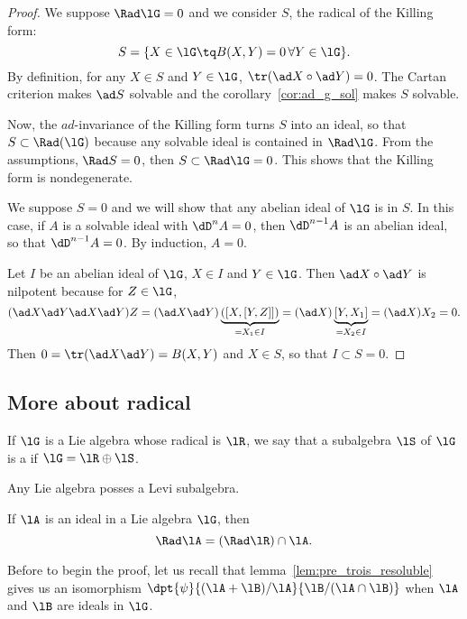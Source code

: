 \begin{proof}
	We suppose $\Rad\lG=0$ and we consider $S$, the radical of the Killing form:
	\[
		S=\{X\in\lG\tq B(X,Y)=0\,\forall Y\in\lG\}.
	\]
	By definition, for any $X\in S$ and $Y\in\lG$, $\tr(\ad X\circ\ad Y)=0$. The Cartan criterion makes $\ad S$ solvable and the corollary~\ref{cor:ad_g_sol} makes $S$ solvable.

	Now, the $ad$-invariance of the Killing form turns $S$ into an ideal, so that $S\subset\Rad(\lG)$ because any solvable ideal is contained in $\Rad\lG$. From the assumptions, $\Rad S=0$, then $S\subset\Rad\lG=0$. This shows that the Killing form is nondegenerate.

	We suppose $S=0$ and we will show that any abelian ideal of $\lG$ is in $S$. In this case, if $A$ is a solvable ideal with $\dD^nA=0$, then $\dD^{n-1}A$ is an abelian ideal, so that $\dD^{n-1}A=0$. By induction, $A=0$.

	Let $I$ be an abelian ideal of $\lG$, $X\in I$ and $Y\in\lG$. Then $\ad X\circ\ad Y$ is nilpotent because for $Z\in\lG$,
	\begin{equation}
		(\ad X\ad Y\ad X\ad Y)Z=(\ad X\ad Y)\underbrace{( [X,[Y,Z]] )}_{=X_1\in I}
		=(\ad X)\underbrace{[Y,X_1]}_{=X_2\in I}
		=(\ad X)X_2
		=0.
	\end{equation}
	Then $0=\tr(\ad X\ad Y)=B(X,Y)$ and $X\in S$, so that $I\subset S=0$.

\end{proof}

\subsection{More about radical}

If $\lG$ is a Lie algebra whose radical is $\lR$, we say that a subalgebra $\lS$ of $\lG$ is a  if $\lG=\lR\oplus\lS$.

Any Lie algebra posses a Levi subalgebra.

\begin{lemma}
	If $\lA$ is an ideal in a Lie algebra $\lG$, then
	\[
		\Rad\lA=(\Rad\lR)\cap\lA.
	\]
	\label{lem:rad_ideal}
\end{lemma}

Before to begin the proof, let us recall that lemma~\ref{lem:pre_trois_resoluble} gives us an isomorphism $\dpt{\psi}{(\lA+\lB)/\lA}{\lB/(\lA\cap\lB)}$ when $\lA$ and $\lB$ are ideals in $\lG$.


